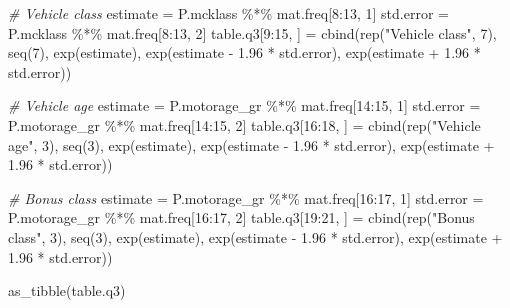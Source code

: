 \documentclass[
]{article}
\newenvironment{Shaded}{\begin{snugshade}}{\end{snugshade}}
\newcommand{\CommentTok}[1]{\textcolor[rgb]{0.56,0.35,0.01}{\textit{#1}}}
\newcommand{\DecValTok}[1]{\textcolor[rgb]{0.00,0.00,0.81}{#1}}
\newcommand{\FloatTok}[1]{\textcolor[rgb]{0.00,0.00,0.81}{#1}}
\newcommand{\FunctionTok}[1]{\textcolor[rgb]{0.00,0.00,0.00}{#1}}
\newcommand{\NormalTok}[1]{#1}
\newcommand{\OtherTok}[1]{\textcolor[rgb]{0.56,0.35,0.01}{#1}}
\newcommand{\SpecialCharTok}[1]{\textcolor[rgb]{0.00,0.00,0.00}{#1}}
\newcommand{\StringTok}[1]{\textcolor[rgb]{0.31,0.60,0.02}{#1}}
\begin{document}
\begin{Shaded}
\begin{Highlighting}[]
\CommentTok{\# Vehicle class}
\NormalTok{estimate }\OtherTok{=}\NormalTok{ P.mcklass }\SpecialCharTok{\%*\%}\NormalTok{ mat.freq[}\DecValTok{8}\SpecialCharTok{:}\DecValTok{13}\NormalTok{, }\DecValTok{1}\NormalTok{]}
\NormalTok{std.error }\OtherTok{=}\NormalTok{ P.mcklass }\SpecialCharTok{\%*\%}\NormalTok{ mat.freq[}\DecValTok{8}\SpecialCharTok{:}\DecValTok{13}\NormalTok{, }\DecValTok{2}\NormalTok{]}
\NormalTok{table.q3[}\DecValTok{9}\SpecialCharTok{:}\DecValTok{15}\NormalTok{, ] }\OtherTok{=} \FunctionTok{cbind}\NormalTok{(}\FunctionTok{rep}\NormalTok{(}\StringTok{"Vehicle class"}\NormalTok{, }\DecValTok{7}\NormalTok{), }\FunctionTok{seq}\NormalTok{(}\DecValTok{7}\NormalTok{), }\FunctionTok{exp}\NormalTok{(estimate), }\FunctionTok{exp}\NormalTok{(estimate }\SpecialCharTok{{-}} \FloatTok{1.96} \SpecialCharTok{*}\NormalTok{ std.error), }\FunctionTok{exp}\NormalTok{(estimate }\SpecialCharTok{+} \FloatTok{1.96} \SpecialCharTok{*}\NormalTok{ std.error))}

\CommentTok{\# Vehicle age}
\NormalTok{estimate }\OtherTok{=}\NormalTok{ P.motorage\_gr }\SpecialCharTok{\%*\%}\NormalTok{ mat.freq[}\DecValTok{14}\SpecialCharTok{:}\DecValTok{15}\NormalTok{, }\DecValTok{1}\NormalTok{]}
\NormalTok{std.error }\OtherTok{=}\NormalTok{ P.motorage\_gr }\SpecialCharTok{\%*\%}\NormalTok{ mat.freq[}\DecValTok{14}\SpecialCharTok{:}\DecValTok{15}\NormalTok{, }\DecValTok{2}\NormalTok{]}
\NormalTok{table.q3[}\DecValTok{16}\SpecialCharTok{:}\DecValTok{18}\NormalTok{, ] }\OtherTok{=} \FunctionTok{cbind}\NormalTok{(}\FunctionTok{rep}\NormalTok{(}\StringTok{"Vehicle age"}\NormalTok{, }\DecValTok{3}\NormalTok{), }\FunctionTok{seq}\NormalTok{(}\DecValTok{3}\NormalTok{), }\FunctionTok{exp}\NormalTok{(estimate), }\FunctionTok{exp}\NormalTok{(estimate }\SpecialCharTok{{-}} \FloatTok{1.96} \SpecialCharTok{*}\NormalTok{ std.error), }\FunctionTok{exp}\NormalTok{(estimate }\SpecialCharTok{+} \FloatTok{1.96} \SpecialCharTok{*}\NormalTok{ std.error))}

\CommentTok{\# Bonus class}
\NormalTok{estimate }\OtherTok{=}\NormalTok{ P.motorage\_gr }\SpecialCharTok{\%*\%}\NormalTok{ mat.freq[}\DecValTok{16}\SpecialCharTok{:}\DecValTok{17}\NormalTok{, }\DecValTok{1}\NormalTok{]}
\NormalTok{std.error }\OtherTok{=}\NormalTok{ P.motorage\_gr }\SpecialCharTok{\%*\%}\NormalTok{ mat.freq[}\DecValTok{16}\SpecialCharTok{:}\DecValTok{17}\NormalTok{, }\DecValTok{2}\NormalTok{]}
\NormalTok{table.q3[}\DecValTok{19}\SpecialCharTok{:}\DecValTok{21}\NormalTok{, ] }\OtherTok{=} \FunctionTok{cbind}\NormalTok{(}\FunctionTok{rep}\NormalTok{(}\StringTok{"Bonus class"}\NormalTok{, }\DecValTok{3}\NormalTok{), }\FunctionTok{seq}\NormalTok{(}\DecValTok{3}\NormalTok{), }\FunctionTok{exp}\NormalTok{(estimate), }\FunctionTok{exp}\NormalTok{(estimate }\SpecialCharTok{{-}} \FloatTok{1.96} \SpecialCharTok{*}\NormalTok{ std.error), }\FunctionTok{exp}\NormalTok{(estimate }\SpecialCharTok{+} \FloatTok{1.96} \SpecialCharTok{*}\NormalTok{ std.error))}

\FunctionTok{as\_tibble}\NormalTok{(table.q3)}
\end{Highlighting}
\end{Shaded}
\end{document}
